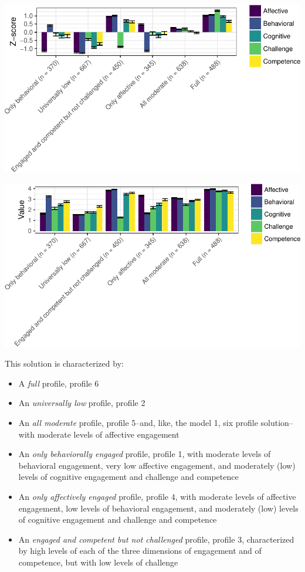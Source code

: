 \documentclass[]{book}
\providecommand{\tightlist}{%
  \setlength{\itemsep}{0pt}\setlength{\parskip}{0pt}}
\theoremstyle{definition}
\theoremstyle{definition}
\theoremstyle{definition}
\theoremstyle{remark}
\begin{document}
\begin{center}\includegraphics[width=0.8\linewidth]{rosenberg-dissertation_files/figure-latex/unnamed-chunk-10-1} \end{center}

\begin{center}\includegraphics[width=0.8\linewidth]{rosenberg-dissertation_files/figure-latex/unnamed-chunk-10-2} \end{center}

This solution is characterized by:

\begin{itemize}
\tightlist
\item
  A \emph{full} profile, profile 6
\item
  An \emph{universally low} profile, profile 2
\item
  An \emph{all moderate} profile, profile 5--and, like, the model 1, six
  profile solution--with moderate levels of affective engagement
\item
  An \emph{only behaviorally engaged} profile, profile 1, with moderate
  levels of behavioral engagement, very low affective engagement, and
  moderately (low) levels of cognitive engagement and challenge and
  competence
\item
  An \emph{only affectively engaged} profile, profile 4, with moderate
  levels of affective engagement, low levels of behavioral engagement,
  and moderately (low) levels of cognitive engagement and challenge and
  competence
\item
  An \emph{engaged and competent but not challenged} profile, profile 3,
  characterized by high levels of each of the three dimensions of
  engagement and of competence, but with low levels of challenge
\end{itemize}
\end{document}
